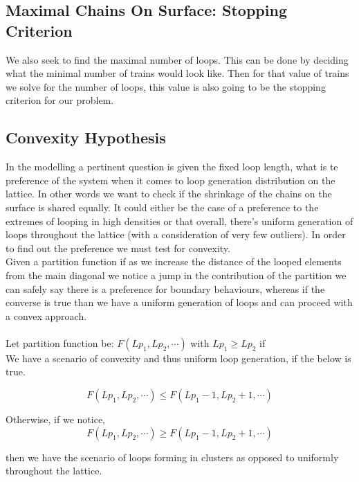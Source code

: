 \documentclass[10pt,letterpaper]{article}
\begin{document}
\newpage
\subsection{Maximal Chains On Surface: Stopping Criterion}

We also seek to find the maximal number of loops. This can be done by deciding what the minimal number of trains would look like. Then for that value of trains we solve for the number of loops, this value is also going to be the stopping criterion for our problem.



\subsection{Convexity Hypothesis}
In the modelling a pertinent question is given the fixed loop length, what is te preference of the system when it comes to loop generation distribution on the lattice. In other words we want to check if the shrinkage of the chains on the surface is shared equally. It could either be the case of a preference to the extremes of looping in high densities or that overall, there's uniform generation of loops throughout the lattice (with a consideration of very few outliers). In order to find out the preference we must test for convexity.\\

\noindent Given a partition function if as we increase the distance of the looped elements from the main diagonal we notice a jump in the contribution of the partition we can safely say there is a preference for boundary behaviours, whereas if the converse is true than we have a uniform generation of loops and can proceed with a convex approach.\\\\

\noindent Let partition function be: $F(Lp_1,Lp_2, \cdots)$ with $Lp_1\geq Lp_2$ if\\

\noindent We have a scenario of convexity and thus uniform loop generation, if the below is true.

$$F(Lp_1,Lp_2, \cdots)\leq F(Lp_1-1,Lp_2+1, \cdots)$$

\noindent Otherwise, if we notice,
$$F(Lp_1,Lp_2, \cdots)\geq F(Lp_1-1,Lp_2+1, \cdots)$$ 

\noindent then we have the scenario of loops forming in clusters as opposed to uniformly throughout the lattice.
\end{document}
